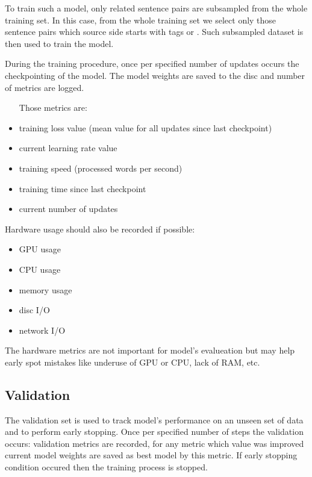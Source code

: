 To train such a model, only related sentence pairs are subsampled
from the whole training set.
In this case, from the whole training set we select only those sentence
pairs which source side starts with tags  or .
Such subsampled dataset is then used to train the model.

During the training procedure, once per specified number of updates
occurs the checkpointing of the model.
The model weights are saved to the disc and number of metrics are logged.

\begin{samepage}
\begin{itemize}
	\item [Those metrics are:]
	\item training loss value (mean value for all updates since
	last checkpoint)
	\item current learning rate value
	\item training speed (processed words per second)
	\item training time since last checkpoint
	\item current number of updates
\end{itemize}
\end{samepage}
\begin{samepage}
Hardware usage should also be recorded if possible:
\begin{itemize}
	\item GPU usage
	\item CPU usage
	\item memory usage
	\item disc I/O
	\item network I/O
\end{itemize}
\end{samepage}

The hardware metrics are not important for model's evalueation
but may help early spot mistakes like underuse of GPU or CPU, lack of RAM, etc.

\subsection{Validation}

The validation set is used to track model's performance
on an unseen set of data and to perform early stopping.
Once per specified number of steps the validation occurs:
validation metrics are recorded, for any metric which value was
improved current model weights are saved as best model by this metric.
If early stopping condition occured then the training process is stopped.


